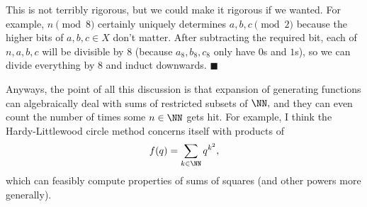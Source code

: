 This is not terribly rigorous, but we could make it rigorous if we wanted. For example, $n\pmod8$ certainly uniquely determines $a,b,c\pmod2$ because the higher bits of $a,b,c\in X$ don't matter. After subtracting the required bit, each of $n,a,b,c$ will be divisible by $8$ (because $a_8,b_8,c_8$ only have $0$s and $1$s), so we can divide everything by $8$ and induct downwards. $\blacksquare$

Anyways, the point of all this discussion is that expansion of generating functions can algebraically deal with sums of restricted subsets of $\NN,$ and they can even count the number of times some $n\in\NN$ gets hit. For example, I think the Hardy-Littlewood circle method concerns itself with products of
\[f(q)=\sum_{k\in\NN}q^{k^2},\]
which can feasibly compute properties of sums of squares (and other powers more generally).